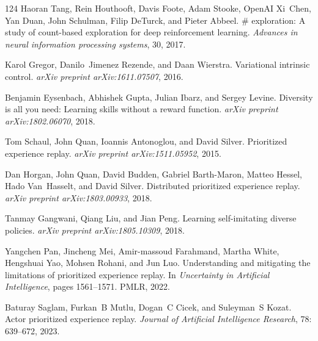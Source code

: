 \documentclass[]{youtu} %
\begin{document}
\begin{thebibliography}{124}
Haoran Tang, Rein Houthooft, Davis Foote, Adam Stooke, OpenAI Xi~Chen, Yan Duan, John Schulman, Filip DeTurck, and Pieter Abbeel.
\newblock \# exploration: A study of count-based exploration for deep reinforcement learning.
\newblock \emph{Advances in neural information processing systems}, 30, 2017.

Karol Gregor, Danilo~Jimenez Rezende, and Daan Wierstra.
\newblock Variational intrinsic control.
\newblock \emph{arXiv preprint arXiv:1611.07507}, 2016.

Benjamin Eysenbach, Abhishek Gupta, Julian Ibarz, and Sergey Levine.
\newblock Diversity is all you need: Learning skills without a reward function.
\newblock \emph{arXiv preprint arXiv:1802.06070}, 2018.

Tom Schaul, John Quan, Ioannis Antonoglou, and David Silver.
\newblock Prioritized experience replay.
\newblock \emph{arXiv preprint arXiv:1511.05952}, 2015.

Dan Horgan, John Quan, David Budden, Gabriel Barth-Maron, Matteo Hessel, Hado Van~Hasselt, and David Silver.
\newblock Distributed prioritized experience replay.
\newblock \emph{arXiv preprint arXiv:1803.00933}, 2018.

Tanmay Gangwani, Qiang Liu, and Jian Peng.
\newblock Learning self-imitating diverse policies.
\newblock \emph{arXiv preprint arXiv:1805.10309}, 2018.

Yangchen Pan, Jincheng Mei, Amir-massoud Farahmand, Martha White, Hengshuai Yao, Mohsen Rohani, and Jun Luo.
\newblock Understanding and mitigating the limitations of prioritized experience replay.
\newblock In \emph{Uncertainty in Artificial Intelligence}, pages 1561--1571. PMLR, 2022.

Baturay Saglam, Furkan~B Mutlu, Dogan~C Cicek, and Suleyman~S Kozat.
\newblock Actor prioritized experience replay.
\newblock \emph{Journal of Artificial Intelligence Research}, 78: 639--672, 2023.


\end{thebibliography}
\end{document}
